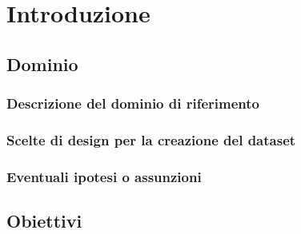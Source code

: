 \setcounter{chapter}{0}

\part{Introduzione}
\label{part:introduzione}

\chapter{Dominio}
\section{Descrizione del dominio di riferimento}
\section{Scelte di design per la creazione del dataset}
\section{Eventuali ipotesi o assunzioni}
\chapter{Obiettivi}
